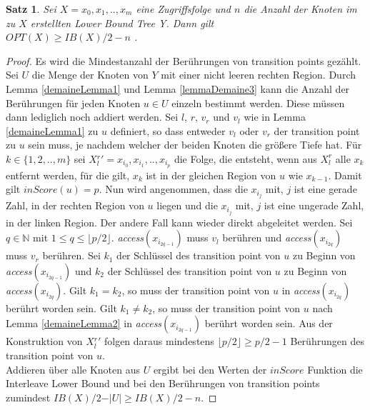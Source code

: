 \documentclass[a4paper,12pt]{article}
\newtheorem{Satz}{Satz}[section]
\begin{document}
\begin{Satz} \label{satzDemaine1}
	Sei $X = x_0, x_1,.., x_m$  eine Zugriffsfolge und $n$ die Anzahl der Knoten im zu $X$ erstellten Lower Bound Tree Y. Dann gilt\\	
	$\mathit{OPT}\left(X\right) \geq \mathit{IB}\left(X\right) /2 - n$ .
\end{Satz}
\begin{proof}
	Es wird die Mindestanzahl der Berührungen von transition points gezählt. Sei $U$ die Menge der Knoten von $Y$ mit einer nicht leeren rechten Region. Durch Lemma \ref{demaineLemma1} und Lemma \ref{lemmaDemaine3} kann die Anzahl der Berührungen für jeden Knoten $u \in U$ einzeln bestimmt werden. Diese müssen dann lediglich noch addiert werden. Sei $l$, $r$, $v_r$ und $v_l$ wie in Lemma \ref{demaineLemma1} zu $u$ definiert, so dass entweder $v_l$ oder $v_r$ der transition point zu $u$ sein muss, je nachdem welcher der beiden Knoten die größere Tiefe hat. Für $k \in \{1, 2,.., m\}$ sei \mbox{$X{^r_l}' = x_{i_0},x_{i_1},..,x_{i_p}$} die Folge, die entsteht, wenn aus $X^r_l$ alle $x_k$ entfernt werden, für die gilt, $x_k$ ist in der gleichen Region von $u$ wie $x_{k-1}$. Damit gilt $\mathit{inScore}\left(u\right) = p$. Nun wird angenommen, dass die $x_{i_j}$ mit, $j$ ist eine gerade Zahl, in der rechten Region von $u$ liegen und die $x_{i_j}$ mit, $j$ ist eine ungerade Zahl, in der linken Region. Der andere Fall kann wieder direkt abgeleitet werden. Sei $q \in \mathbb{N}$ mit $1 \leq q \leq \lfloor p / 2 \rfloor$. \textit{access}$\left( x_{i_{2q-1}} \right)$ muss $v_l$ berühren und \textit{access}$\left( x_{i_{2q}} \right)$ muss $v_r$ berühren. Sei $k_{1}$ der Schlüssel des transition point von $u$ zu Beginn von \textit{access}$\left( x_{i_{2q-1}} \right)$ und  $k_{2}$ der Schlüssel des transition point von $u$ zu Beginn von \textit{access}$\left( x_{i_{2q}} \right)$. Gilt $k_{1} = k_{2}$, so muss der transition point von $u$ in \textit{access}$\left( x_{i_{2q}} \right)$ berührt worden sein.  Gilt $k_{1} \ne k_{2}$, so muss der transition point von $u$ nach Lemma \ref{demaineLemma2} in \textit{access}$\left( x_{i_{2q-1}} \right)$ berührt worden sein. Aus der Konstruktion von $X{^r_l}'$ folgen daraus mindestens $\lfloor p/2 \rfloor \geq p/2 - 1$ Berührungen des transition point von $u$. \\
	Addieren über alle Knoten aus $U$ ergibt bei den Werten der $\mathit{inScore}$ Funktion die Interleave Lower Bound und bei den Berührungen von transition points zumindest  $\mathit{IB}\left(X\right) /2 - \vert U \vert \geq \mathit{IB}\left(X\right) /2 - n$.
	
\end{proof}
\end{document}
